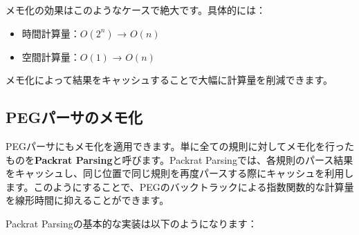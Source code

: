 メモ化の効果はこのようなケースで絶大です。具体的には：

\begin{itemize}
\tightlist
\item
  時間計算量：\(O(2^n)\) → \(O(n)\)
\item
  空間計算量：\(O(1)\) → \(O(n)\)
\end{itemize}

メモ化によって結果をキャッシュすることで大幅に計算量を削減できます。

\hypertarget{chapter5-pegux30d1ux30fcux30b5ux306eux30e1ux30e2ux5316}{%
\subsection{PEGパーサのメモ化}\label{chapter5-pegux30d1ux30fcux30b5ux306eux30e1ux30e2ux5316}}

PEGパーサにもメモ化を適用できます。単に全ての規則に対してメモ化を行ったものを\textbf{Packrat
Parsing}と呼びます。Packrat
Parsingでは、各規則のパース結果をキャッシュし、同じ位置で同じ規則を再度パースする際にキャッシュを利用します。このようにすることで、PEGのバックトラックによる指数関数的な計算量を線形時間に抑えることができます。

Packrat Parsingの基本的な実装は以下のようになります：

